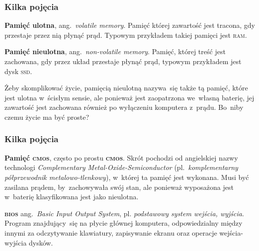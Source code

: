 \documentclass[10pt,t]{beamer}
\begin{document}
\begin{frame}
  \frametitle{Kilka pojęcia}


  \textbf{Pamięć ulotna}, ang.~\textit{volatile memory}. Pamięć której
  zawartość jest tracona, gdy przestaje przez nią płynąć prąd. Typowym
  przykładem takiej pamięci jest \textsc{ram}.

  \textbf{Pamięć nieulotna}, ang.~\textit{non-volatile memory}. Pamięć,
  której treść jest zachowana, gdy przez układ przestaje płynąć prąd,
  typowym przykładem jest dysk \textsc{ssd}.

  Żeby skomplikować życie, pamięcią nieulotną nazywa~się także tą pamięć,
  które jest ulotna w~ścisłym sensie, ale ponieważ jest zaopatrzona
  we~własną baterię, jej zawartość jest zachowana również po wyłączeniu
  komputera z~prądu. Bo~niby czemu życie ma być proste?

\end{frame}





\begin{frame}
  \frametitle{Kilka pojęcia}


  \textbf{Pamięć \textsc{cmos}}, często po prostu \textbf{\textsc{cmos}}.
  Skrót pochodzi od angielskiej nazwy technologi \textit{Complementary
    Metal-Oxide-Semiconductor} (pl.~\textit{komplementarny półprzewodnik
    metalowo-tlenkowy}), w~której ta pamięć jest wykonana. Musi być zasilana
  prądem, by~zachowywała swój stan, ale ponieważ wyposażona jest w~baterię
  klasyfikowana jest jako nieulotna.

  \textbf{\textsc{bios}} ang.~\textit{Basic Input Output System}, pl.
  \textit{podstawowy system wejścia, wyjścia}. Program znajdujący~się
  na płycie głównej komputera, odpowiedzialny między innymi za odczytywanie
  klawiatury, zapisywanie ekranu oraz operacje wejścia-wyjścia dysków.

\end{frame}
\end{document}
